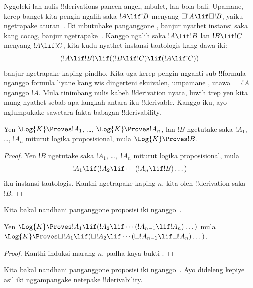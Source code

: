 \documentclass[../../../include/open-logic-section]{subfiles}
\begin{document}


Nggoleki lan nulis !!{derivation}s pancen angel,
mbulet, lan bola-bali. Upamane, kerep banget kita pengin ngalih saka
$!A \lif !B$ menyang $\Box !A \lif \Box !B$, yaiku ngetrapake
aturan~\RK. Iki mbutuhake panganggone \Nec, banjur nyathet instansi
saka~ kang cocog, banjur ngetrapake~\MP. Kanggo ngalih saka
$!A \lif !B$ lan $!B \lif !C$ menyang $!A \lif !C$, kita kudu
nyathet instansi tautologis kang dawa iki:
\[
(!A \lif !B) \lif ((!B \lif !C) \lif (!A \lif !C))
\]
banjur ngetrapake \MP{} kaping pindho. Kita uga kerep pengin ngganti
sub-!!{formula} nganggo formula liyane kang wis dingerteni ekuivalen,
umpamane ,
utawa $\lnot\lnot !A$ nganggo $!A$. Mula tinimbang nulis kabeh
!!{derivation} nyata, luwih trep yen kita mung nyathet sebab apa
langkah antara iku !!{derivable}. Kanggo iku, ayo nglumpukake
sawetara fakta babagan !!{derivability}.

\begin{prop}
  Yen $\Log{K} \Proves !A_1$, \dots, $\Log{K} \Proves !A_n$, lan $!B$
  ngetutake saka $!A_1$, \dots, $!A_n$ miturut logika proposisional,
  mula $\Log{K} \Proves !B$.
\end{prop}

\begin{proof}
  Yen $!B$ ngetutake saka $!A_1$, \dots,~$!A_n$ miturut logika
  proposisional, mula
  \[
  !A_1 \lif (!A_2 \lif \cdots (!A_n \lif !B)\dots)
  \]
  iku instansi tautologis. Kanthi ngetrapake \MP{} kaping $n$, kita
  oleh !!{derivation} saka~$!B$.
\end{proof}

Kita bakal nandhani panganggone proposisi iki nganggo~\PL.

\begin{prop}
  Yen $\Log{K} \Proves !A_1 \lif (!A_2 \lif \cdots (!A_{n-1} \lif
  !A_n)\dots)$ mula $\Log{K} \Proves \Box !A_1 \lif (\Box !A_2 \lif
  \cdots (\Box !A_{n-1} \lif \Box !A_n)\dots)$.
\end{prop}

\begin{proof}
  Kanthi induksi marang $n$, padha kaya bukti .
\end{proof}

Kita bakal nandhani panganggone proposisi iki nganggo~\RK.
Ayo dideleng kepiye asil iki nggampangake netepake
!!{derivability}.
\end{document}
